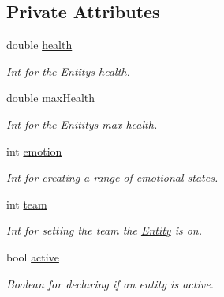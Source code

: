 \subsection*{Private Attributes}
\begin{DoxyCompactItemize}
\item 
double \hyperlink{classEntity_af5e13d4ed49e8f2954112784a73939ce}{health}\hypertarget{classEntity_af5e13d4ed49e8f2954112784a73939ce}{}\label{classEntity_af5e13d4ed49e8f2954112784a73939ce}

\begin{DoxyCompactList}\small\item\em Int for the \hyperlink{classEntity}{Entity}\textquotesingle{}s health. \end{DoxyCompactList}\item 
double \hyperlink{classEntity_a814aed95740c20b413e7acf387da9e9b}{max\+Health}\hypertarget{classEntity_a814aed95740c20b413e7acf387da9e9b}{}\label{classEntity_a814aed95740c20b413e7acf387da9e9b}

\begin{DoxyCompactList}\small\item\em Int for the Enitity\textquotesingle{}s max health. \end{DoxyCompactList}\item 
int \hyperlink{classEntity_a85a5efaff91b778e660972a9edcd1f27}{emotion}\hypertarget{classEntity_a85a5efaff91b778e660972a9edcd1f27}{}\label{classEntity_a85a5efaff91b778e660972a9edcd1f27}

\begin{DoxyCompactList}\small\item\em Int for creating a range of emotional states. \end{DoxyCompactList}\item 
int \hyperlink{classEntity_ad87a0ad851b569ef13889d903d502079}{team}\hypertarget{classEntity_ad87a0ad851b569ef13889d903d502079}{}\label{classEntity_ad87a0ad851b569ef13889d903d502079}

\begin{DoxyCompactList}\small\item\em Int for setting the team the \hyperlink{classEntity}{Entity} is on. \end{DoxyCompactList}\item 
bool \hyperlink{classEntity_a939da33e8b67b1d2ee227930aa72da3b}{active}\hypertarget{classEntity_a939da33e8b67b1d2ee227930aa72da3b}{}\label{classEntity_a939da33e8b67b1d2ee227930aa72da3b}

\begin{DoxyCompactList}\small\item\em Boolean for declaring if an entity is active. \end{DoxyCompactList}\end{DoxyCompactItemize}


